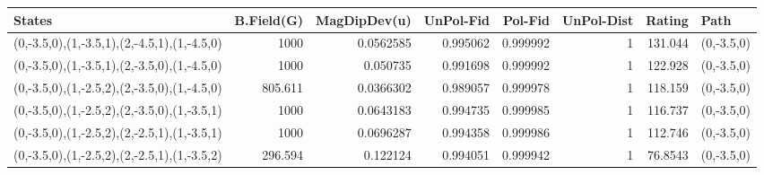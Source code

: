 \begin{tabular}{lrrrrrrl}
\hline
 States                                      &   B.Field(G) &   MagDipDev(u) &   UnPol-Fid &   Pol-Fid &   UnPol-Dist &   Rating & Path       \\
\hline
 (0,-3.5,0),(1,-3.5,1),(2,-4.5,1),(1,-4.5,0) &     1000     &      0.0562585 &    0.995062 &  0.999992 &            1 & 131.044  & (0,-3.5,0) \\
 (0,-3.5,0),(1,-3.5,1),(2,-3.5,0),(1,-4.5,0) &     1000     &      0.050735  &    0.991698 &  0.999992 &            1 & 122.928  & (0,-3.5,0) \\
 (0,-3.5,0),(1,-2.5,2),(2,-3.5,0),(1,-4.5,0) &      805.611 &      0.0366302 &    0.989057 &  0.999978 &            1 & 118.159  & (0,-3.5,0) \\
 (0,-3.5,0),(1,-2.5,2),(2,-3.5,0),(1,-3.5,1) &     1000     &      0.0643183 &    0.994735 &  0.999985 &            1 & 116.737  & (0,-3.5,0) \\
 (0,-3.5,0),(1,-2.5,2),(2,-2.5,1),(1,-3.5,1) &     1000     &      0.0696287 &    0.994358 &  0.999986 &            1 & 112.746  & (0,-3.5,0) \\
 (0,-3.5,0),(1,-2.5,2),(2,-2.5,1),(1,-3.5,2) &      296.594 &      0.122124  &    0.994051 &  0.999942 &            1 &  76.8543 & (0,-3.5,0) \\
\hline
\end{tabular}